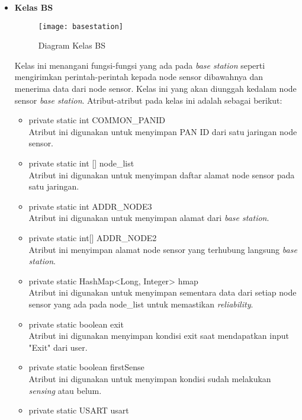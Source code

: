 \begin{itemize}
\begin{itemize}
\begin{itemize}
        \end{itemize}
        \item \textbf{Kelas BS}\\
        \begin{figure}[h]
        	\centering
        	\texttt{[image: basestation]}
        	\caption{Diagram Kelas BS}
        	\label{fig:basestation}
        \end{figure}
        Kelas ini menangani fungsi-fungsi yang ada pada \textit{base station} seperti mengirimkan perintah-perintah kepada node sensor dibawahnya dan menerima data dari node sensor. Kelas ini yang akan diunggah kedalam node sensor \textit{base station}. Atribut-atribut pada kelas ini adalah sebagai berikut:
        \begin{itemize}
            \item private static int COMMON\_PANID\\
            Atribut ini digunakan untuk menyimpan PAN ID dari satu jaringan node sensor.
            \item private static int [] node\_list\\
            Atribut ini digunakan untuk menyimpan daftar alamat node sensor pada satu jaringan.
            \item private static int ADDR\_NODE3\\
            Atribut ini digunakan untuk menyimpan alamat dari \textit{base station}.
            \item private static int[] ADDR\_NODE2\\
            Atribut ini menyimpan alamat node sensor yang terhubung langsung \textit{base station}.
            \item private static HashMap<Long, Integer> hmap\\
            Atribut ini digunakan untuk menyimpan sementara data dari setiap node sensor yang ada pada node\_list untuk memastikan \textit{reliability}.
            \item private static boolean exit\\
            Atribut ini digunakan menyimpan kondisi exit saat mendapatkan input "Exit" dari user.
            \item private static boolean firstSense\\
            Atribut ini digunakan untuk menyimpan kondisi sudah melakukan \textit{sensing} atau belum.
            \item private static USART usart\\

\end{itemize}
\end{itemize}
\end{itemize}
